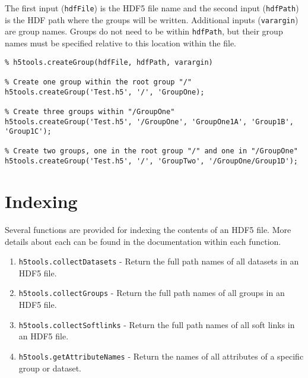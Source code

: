 \documentclass[11pt]{exam}
\newcommand\myfcn[1]{\colorbox{codegray}{\textcolor{codeblue}{\texttt{#1}}}}
\begin{document}
        The first input (\texttt{hdfFile}) is the HDF5 file name and the second input (\texttt{hdfPath}) is the HDF path where the groups will be written. Additional inputs (\texttt{varargin}) are group names. Groups do not need to be within \texttt{hdfPath}, but their group names must be specified relative to this location within the file. 
		\begin{lstlisting}[style=matlab-editor, basicstyle=\mlttfamily\footnotesize]
% SYNTAX
% h5tools.createGroup(hdfFile, hdfPath, varargin)

% Create one group within the root group "/"
h5tools.createGroup('Test.h5', '/', 'GroupOne);

% Create three groups within "/GroupOne"
h5tools.createGroup('Test.h5', '/GroupOne', 'GroupOne1A', 'Group1B', 'Group1C');

% Create two groups, one in the root group "/" and one in "/GroupOne"
h5tools.createGroup('Test.h5', '/', 'GroupTwo', '/GroupOne/Group1D');
		\end{lstlisting}
		

    \section{Indexing}
    \noindent Several functions are provided for indexing the contents of an HDF5 file. More details about each can be found in the documentation within each function.
    \begin{enumerate}
        \item \myfcn{h5tools.collectDatasets} - Return the full path names of all datasets in an HDF5 file. 
        \item \myfcn{h5tools.collectGroups} - Return the full path names of all groups in an HDF5 file. 
        \item \myfcn{h5tools.collectSoftlinks} - Return the full path names of all soft links in an HDF5 file. 
        \item \myfcn{h5tools.getAttributeNames} - Return the names of all attributes of a specific group or dataset. 
    \end{enumerate}
\end{document}
